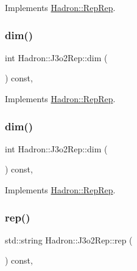 Implements \mbox{\hyperlink{structHadron_1_1RepRep_a92c8802e5ed7afd7da43ccfd5b7cd92b}{Hadron\+::\+Rep\+Rep}}.

\mbox{\label{structHadron_1_1J3o2Rep_a119556341b3fb8bfb4615b3798973c9c}} 
\subsubsection{\texorpdfstring{dim()}{dim()}\hspace{0.1cm}{\footnotesize\ttfamily [2/3]}}
{\footnotesize\ttfamily int Hadron\+::\+J3o2\+Rep\+::dim (\begin{DoxyParamCaption}{ }\end{DoxyParamCaption}) const\hspace{0.3cm}{\ttfamily [inline]}, {\ttfamily [virtual]}}



Implements \mbox{\hyperlink{structHadron_1_1RepRep_a92c8802e5ed7afd7da43ccfd5b7cd92b}{Hadron\+::\+Rep\+Rep}}.

\mbox{\label{structHadron_1_1J3o2Rep_a119556341b3fb8bfb4615b3798973c9c}} 
\subsubsection{\texorpdfstring{dim()}{dim()}\hspace{0.1cm}{\footnotesize\ttfamily [3/3]}}
{\footnotesize\ttfamily int Hadron\+::\+J3o2\+Rep\+::dim (\begin{DoxyParamCaption}{ }\end{DoxyParamCaption}) const\hspace{0.3cm}{\ttfamily [inline]}, {\ttfamily [virtual]}}



Implements \mbox{\hyperlink{structHadron_1_1RepRep_a92c8802e5ed7afd7da43ccfd5b7cd92b}{Hadron\+::\+Rep\+Rep}}.

\mbox{\label{structHadron_1_1J3o2Rep_a4284616b9bdc9582f085ab1b60a15f1d}} 
\subsubsection{\texorpdfstring{rep()}{rep()}\hspace{0.1cm}{\footnotesize\ttfamily [1/3]}}
{\footnotesize\ttfamily std\+::string Hadron\+::\+J3o2\+Rep\+::rep (\begin{DoxyParamCaption}{ }\end{DoxyParamCaption}) const\hspace{0.3cm}{\ttfamily [inline]}, {\ttfamily [virtual]}}



